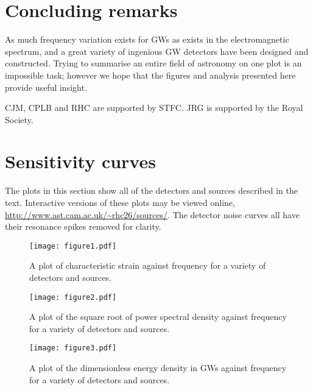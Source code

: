 \documentclass[fleqn,12pt]{iopart}
\begin{document}
\section{Concluding remarks}\label{sec:discussion}
As much frequency variation exists for GWs as exists in the electromagnetic spectrum, and a great variety of ingenious GW detectors have been designed and constructed. Trying to summarise an entire field of astronomy on one plot is an impossible task; however we hope that the figures and analysis presented here provide useful insight.

\ack
CJM, CPLB and RHC are supported by STFC. JRG is supported by the Royal Society.

\appendix

\section{Sensitivity curves}\label{app:a}

The plots in this section show all of the detectors and sources described in the text. Interactive versions of these plots may be viewed online, \url{http://www.ast.cam.ac.uk/~rhc26/sources/}. The detector noise curves all have their resonance spikes removed for clarity. 
\begin{figure}[h!]
 \centering
 \texttt{[image: figure1.pdf]}
 \caption{A plot of characteristic strain against frequency for a variety of detectors and sources.}
 \label{fig:hc}
\end{figure}
\begin{figure}[h!]
 \centering
 \texttt{[image: figure2.pdf]}
 \caption{A plot of the square root of power spectral density against frequency for a variety of detectors and sources.}
 \label{fig:S}
\end{figure}
\begin{figure}[h!]
 \centering
 \texttt{[image: figure3.pdf]}
 \caption{A plot of the dimensionless energy density in GWs against frequency for a variety of detectors and sources.}
 \label{fig:omega}
\end{figure}



\end{document}
